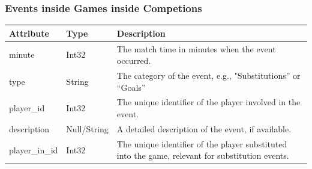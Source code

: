 \documentclass{Configuration_Files/PoliMi3i_thesis}
\begin{document}
\subsubsection{Events inside Games inside Competions}
\begin{tabular}{|l|l|p{8cm}|}
    \hline
    \textbf{Attribute}   & \textbf{Type}         & \textbf{Description} \\ \hline
    minute               & Int32                 & The match time in minutes when the event occurred. \\ \hline
    type                 & String                & The category of the event, e.g., "Substitutions” or “Goals” \\ \hline
    player\_id           & Int32                 & The unique identifier of the player involved in the event. \\ \hline
    description          & Null/String           & A detailed description of the event, if available. \\ \hline
    player\_in\_id       & Int32                 & The unique identifier of the player substituted into the game, relevant for substitution events. \\ \hline
    \end{tabular}
\end{document}
